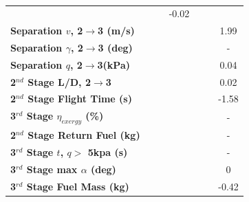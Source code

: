 \begin{table}[ht]
\begin{tabular}{l c c c c c c}
	& \secondthirdSeparationAltqFiftyFive
	& \secondthirdSeparationAltqSixty
	&-0.02
	\\
	\textbf{Separation $v$, 2$\rightarrow$3 (m/s)}
	& \secondthirdSeparationvqForty
	& \secondthirdSeparationvqFortyFive
	& \secondthirdSeparationvqStandard
	& \secondthirdSeparationvqFiftyFive
	& \secondthirdSeparationvqSixty
	&1.99
	\\
	\textbf{Separation $\gamma$, 2$\rightarrow$3 (deg)}
	& \secondthirdSeparationgammaqForty
	& \secondthirdSeparationgammaqFortyFive
	& \secondthirdSeparationgammaqStandard
	& \secondthirdSeparationgammaqFiftyFive
	& \secondthirdSeparationgammaqSixty
	& -
	\\
	\textbf{Separation $q$, 2$\rightarrow$3(kPa)}
	& \secondthirdSeparationqqForty
	& \secondthirdSeparationqqFortyFive
	& \secondthirdSeparationqqStandard
	& \secondthirdSeparationqqFiftyFive
	& \secondthirdSeparationqqSixty
	&0.04
	\\
	\textbf{2$^{nd}$ Stage L/D, 2$\rightarrow$3}
	& \secondthirdSeparationLDqForty
	& \secondthirdSeparationLDqFortyFive
	& \secondthirdSeparationLDqStandard
	& \secondthirdSeparationLDqFiftyFive
	& \secondthirdSeparationLDqSixty
	&0.02
	\\
	\textbf{2$^{nd}$ Stage Flight Time (s)}
	& \secondFlightTimeqForty
	& \secondFlightTimeqFortyFive
	& \secondFlightTimeqStandard
	& \secondFlightTimeqFiftyFive
	& \secondFlightTimeqSixty
	&-1.58
	\\
	\hline 
	\textbf{3$^{rd}$ Stage $\eta_{exergy}$ (\%)}
	& \textbf{\thirddExergyEffqForty}
	& \textbf{\thirddExergyEffqFortyFive}
	& \textbf{\thirddExergyEffqStandard}
	& \textbf{\thirddExergyEffqFiftyFive}
	& \textbf{\thirddExergyEffqSixty}
	& -
	\\
	\textbf{2$^{nd}$ Stage Return Fuel (kg)}
	& \returnFuelqForty
	& \returnFuelqFortyFive
	& \returnFuelqStandard
	& \returnFuelqFiftyFive
	& \returnFuelqSixty
	& -
	\\
	\textbf{3$^{rd}$ Stage $t$, $q >$ 5kpa (s)}
	& \thirdqOverFiveqForty
	& \thirdqOverFiveqFortyFive
	& \thirdqOverFiveqStandard
	& \thirdqOverFiveqFiftyFive
	& \thirdqOverFiveqSixty
	& -
	\\
	\textbf{3$^{rd}$ Stage max $\alpha$ (deg)}
	& \thirdmaxAoAqForty
	& \thirdmaxAoAqFortyFive
	& \thirdmaxAoAqStandard
	& \thirdmaxAoAqFiftyFive
	& \thirdmaxAoAqSixty
	&0
	\\
	\textbf{3$^{rd}$ Stage Fuel Mass (kg)}
	& \thirdmFuelqForty
	& \thirdmFuelqFortyFive
	& \thirdmFuelqStandard
	& \thirdmFuelqFiftyFive
	& \thirdmFuelqSixty
	&-0.42
	\\
	\hline 
\end{tabular} 
\caption{}
\label{tab:qvarreturn}
\end{table}


